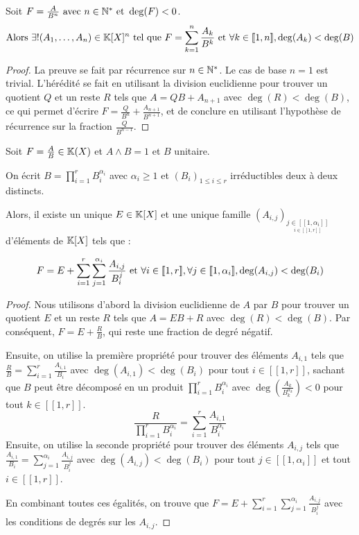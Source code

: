 \documentclass[12pt,a4paper]{report}
\begin{document}
\begin{property}
    Soit $F=\frac{A}{B^n} \text{ avec } n \in \mathbb{N}^* \text{ et } \deg(F) < 0$.
    $$\text{Alors } \exists ! (A_1, \dots, A_n) \in \mathbb{K}[X]^n \text{ tel que } F = \sum_{k=1}^{n} \frac{A_k}{B^k} \text{ et } \forall k \in [\![1,n]\!], \deg(A_k) < \deg(B)$$
\end{property}

\begin{proof}
    La preuve se fait par récurrence sur $n \in \mathbb{N}^*$. Le cas de base $n=1$ est trivial. L'hérédité se fait en utilisant la division euclidienne pour trouver un quotient $Q$ et un reste $R$ tels que $A = QB + A_{n+1}$ avec $\deg(R) < \deg(B)$, ce qui permet d'écrire $F = \frac{Q}{B^n} + \frac{A_{n+1}}{B^{n+1}}$, et de conclure en utilisant l'hypothèse de récurrence sur la fraction $\frac{Q}{B^{n-1}}$.
\end{proof}

\begin{theorem}
    Soit $F = \frac AB \in \mathbb{K}(X)$ et $A\wedge B = 1$ et $B$ unitaire.

    On écrit $B = \prod_{i=1}^r B_i^{\alpha_i}$ avec $\alpha_i \ge 1$ et $(B_i)_{1\le i \le r}$ irréductibles deux à deux distincts.
    
    Alors, il existe un unique $E \in \mathbb{K}[X]$ et une unique famille $(A_{i,j})_{\underset{i \in [\![1,r]\!]}{j \in [\![1,\alpha_i]\!]}}$ d'éléments de $\mathbb{K}[X]$ tels que :

    $$F = E + \sum_{i=1}^r \sum_{j=1}^{\alpha_i} \frac{A_{i,j}}{B_i^j} \text{ et } \forall i \in [\![1,r]\!], \forall j \in [\![1,\alpha_i]\!], \deg(A_{i,j}) < \deg(B_i)$$
\end{theorem}

\begin{proof}
    Nous utilisons d'abord la division euclidienne de $A$ par $B$ pour trouver un quotient $E$ et un reste $R$ tels que $A = EB + R$ avec $\deg(R) < \deg(B)$. Par conséquent, $F = E + \frac RB$, qui reste une fraction de degré négatif. 
    
    Ensuite, on utilise la première propriété pour trouver des éléments $A_{i,1}$ tels que $\frac RB = \sum_{i=1}^r \frac{A_{i,1}}{B_i}$ avec $\deg(A_{i,1}) < \deg(B_i)$ pour tout $i \in [\![1,r]\!]$, sachant que $B$ peut être décomposé en un produit $\prod_{i=1}^r B_i^{\alpha_i}$ avec $\deg(\frac{A_k}{B_k^{\alpha_k}}) < 0$ pour tout $k \in [\![1,r]\!]$.
    $$\frac{R}{\prod_{i=1}^r B_i^{\alpha_i}} = \sum_{i=1}^r \frac{A_{i,1}}{B_i^{\alpha_i}}$$
    Ensuite, on utilise la seconde propriété pour trouver des éléments $A_{i,j}$ tels que $\frac{A_{i,1}}{B_i} = \sum_{j=1}^{\alpha_i} \frac{A_{i,j}}{B_i^j}$ avec $\deg(A_{i,j}) < \deg(B_i)$ pour tout $j \in [\![1,\alpha_i]\!]$ et tout $i \in [\![1,r]\!]$.
    
    En combinant toutes ces égalités, on trouve que $F = E + \sum_{i=1}^r \sum_{j=1}^{\alpha_i} \frac{A_{i,j}}{B_i^j}$ avec les conditions de degrés sur les $A_{i,j}$.
\end{proof}
\end{document}

